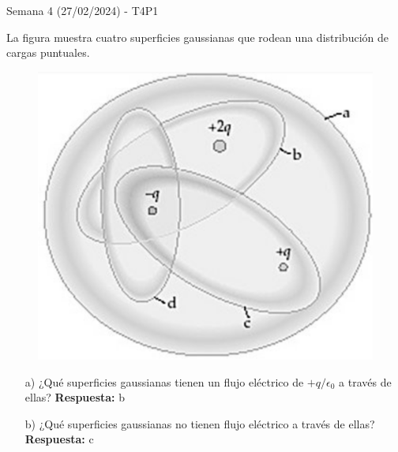 \begin{frame}{Semana 4 (27/02/2024) - T4P1}
    
    La figura muestra cuatro superficies gaussianas que rodean una distribución de cargas puntuales.
    
    \begin{figure}
        \centering
        \includegraphics[scale=0.25]{figures/t4p1.png}
    \end{figure}
    
    \begin{itemize}
        \item[a)] ¿Qué superficies gaussianas tienen un flujo eléctrico de $+q/\epsilon_0$ a través de ellas? 
        \pause \textbf{Respuesta:} b
        \pause \item[b)] ¿Qué superficies gaussianas no tienen flujo eléctrico a través de ellas? 
        \pause \textbf{Respuesta:} c
    \end{itemize}
    
\end{frame}


